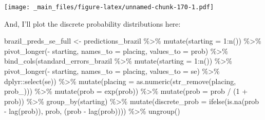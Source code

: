 \documentclass[
]{book}
\newenvironment{Shaded}{\begin{snugshade}}{\end{snugshade}}
\newcommand{\AttributeTok}[1]{\textcolor[rgb]{0.77,0.63,0.00}{#1}}
\newcommand{\DecValTok}[1]{\textcolor[rgb]{0.00,0.00,0.81}{#1}}
\newcommand{\FunctionTok}[1]{\textcolor[rgb]{0.00,0.00,0.00}{#1}}
\newcommand{\NormalTok}[1]{#1}
\newcommand{\OtherTok}[1]{\textcolor[rgb]{0.56,0.35,0.01}{#1}}
\newcommand{\SpecialCharTok}[1]{\textcolor[rgb]{0.00,0.00,0.00}{#1}}
\newcommand{\StringTok}[1]{\textcolor[rgb]{0.31,0.60,0.02}{#1}}
\begin{document}
\texttt{[image: \_main\_files/figure-latex/unnamed-chunk-170-1.pdf]}

And, I'll plot the discrete probability distributions here:

\begin{Shaded}
\begin{Highlighting}[]
\NormalTok{brazil\_preds\_se\_full }\OtherTok{\textless{}{-}}\NormalTok{ predictions\_brazil }\SpecialCharTok{\%\textgreater{}\%}
  \FunctionTok{mutate}\NormalTok{(}\AttributeTok{starting =} \DecValTok{1}\SpecialCharTok{:}\FunctionTok{n}\NormalTok{()) }\SpecialCharTok{\%\textgreater{}\%}
  \FunctionTok{pivot\_longer}\NormalTok{(}\SpecialCharTok{{-}}\NormalTok{ starting, }\AttributeTok{names\_to =} \StringTok{\textquotesingle{}placing\textquotesingle{}}\NormalTok{, }\AttributeTok{values\_to =} \StringTok{\textquotesingle{}prob\textquotesingle{}}\NormalTok{) }\SpecialCharTok{\%\textgreater{}\%} 
  \FunctionTok{bind\_cols}\NormalTok{(standard\_errors\_brazil }\SpecialCharTok{\%\textgreater{}\%} \FunctionTok{mutate}\NormalTok{(}\AttributeTok{starting =} \DecValTok{1}\SpecialCharTok{:}\FunctionTok{n}\NormalTok{()) }\SpecialCharTok{\%\textgreater{}\%}
  \FunctionTok{pivot\_longer}\NormalTok{(}\SpecialCharTok{{-}}\NormalTok{ starting, }\AttributeTok{names\_to =} \StringTok{\textquotesingle{}placing\textquotesingle{}}\NormalTok{, }\AttributeTok{values\_to =} \StringTok{\textquotesingle{}se\textquotesingle{}}\NormalTok{) }\SpecialCharTok{\%\textgreater{}\%}
\NormalTok{    dplyr}\SpecialCharTok{::}\FunctionTok{select}\NormalTok{(se)) }\SpecialCharTok{\%\textgreater{}\%}
  \FunctionTok{mutate}\NormalTok{(}\AttributeTok{placing =} \FunctionTok{as.numeric}\NormalTok{(}\FunctionTok{str\_remove}\NormalTok{(placing, }\StringTok{\textquotesingle{}prob\_\textquotesingle{}}\NormalTok{))) }\SpecialCharTok{\%\textgreater{}\%}
  \FunctionTok{mutate}\NormalTok{(}\AttributeTok{prob =} \FunctionTok{exp}\NormalTok{(prob)) }\SpecialCharTok{\%\textgreater{}\%}
  \FunctionTok{mutate}\NormalTok{(}\AttributeTok{prob =}\NormalTok{ prob }\SpecialCharTok{/}\NormalTok{ (}\DecValTok{1} \SpecialCharTok{+}\NormalTok{ prob)) }\SpecialCharTok{\%\textgreater{}\%}
  \FunctionTok{group\_by}\NormalTok{(starting) }\SpecialCharTok{\%\textgreater{}\%} 
  \FunctionTok{mutate}\NormalTok{(}\AttributeTok{discrete\_prob =} \FunctionTok{ifelse}\NormalTok{(}\FunctionTok{is.na}\NormalTok{(prob }\SpecialCharTok{{-}} \FunctionTok{lag}\NormalTok{(prob)), prob, (prob }\SpecialCharTok{{-}} \FunctionTok{lag}\NormalTok{(prob)))) }\SpecialCharTok{\%\textgreater{}\%}
  \FunctionTok{ungroup}\NormalTok{()}



\end{Highlighting}
\end{Shaded}
\end{document}

